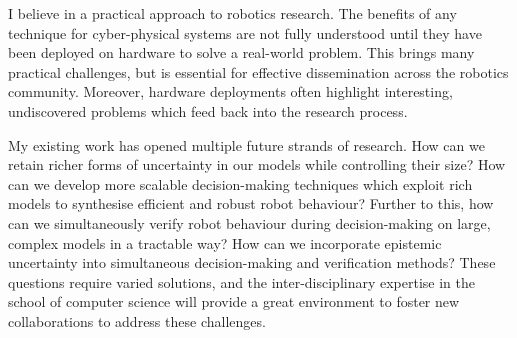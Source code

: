 \documentclass[12pt]{article}
\begin{document}
I believe in a practical approach to robotics research.
%
The benefits of any technique for cyber-physical systems are not fully understood until they have been deployed on hardware to solve a real-world problem.
%
This brings many practical challenges, but is essential for effective dissemination across the robotics community.
%
Moreover, hardware deployments often highlight interesting, undiscovered problems which feed back into the research process.



My existing work has opened multiple future strands of research.
%
How can we retain richer forms of uncertainty in our models while controlling their size?
%
How can we develop more scalable decision-making techniques which exploit rich models to synthesise efficient and robust robot behaviour?
%
Further to this, how can we simultaneously verify robot behaviour during decision-making on large, complex models in a tractable way?
%
How can we incorporate epistemic uncertainty into simultaneous decision-making and verification methods?
%
These questions require varied solutions, and the inter-disciplinary expertise in the school of computer science will provide a great environment to foster new collaborations to address these challenges.
\end{document}
